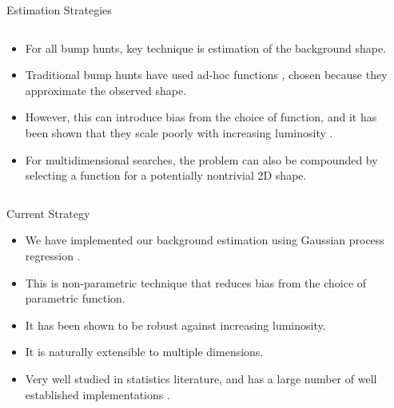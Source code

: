 \documentclass[10pt]{beamer}
\begin{document}
\begin{frame}{Estimation Strategies}
  \begin{columns}
    \begin{halfcol}
      \begin{itemize}
      \item For all bump hunts, key technique is estimation of the background shape. 
      \item Traditional bump hunts have used ad-hoc functions \cite{zisopoulos_parametric_2023}, chosen because they approximate the observed shape. 
      \item However, this can introduce bias from the choice of function, and it has been shown that they scale poorly with increasing luminosity \cite{frate_modeling_2017}.
      \item For multidimensional searches, the problem can also be compounded by selecting a function for a potentially nontrivial 2D shape. 
      \end{itemize}
    \end{halfcol}

    \begin{halfcol}
      \begin{center}
      \end{center}
    \end{halfcol}

  \end{columns}
\end{frame}

\begin{frame}{Current Strategy}
  \begin{itemize}
  \item We have implemented our background estimation using Gaussian process regression \cite{rasmussen_gaussian_2006}.
  \item This is non-parametric technique that reduces bias from the choice of parametric function.
  \item It has been shown to be robust against increasing luminosity\cite{frate_modeling_2017}.
  \item It is naturally extensible to multiple dimensions.
  \item Very well studied in statistics literature, and has a large number of well established implementations \cite{gardner_gpytorch_2021}. 
  \end{itemize}
\end{frame}
\end{document}
